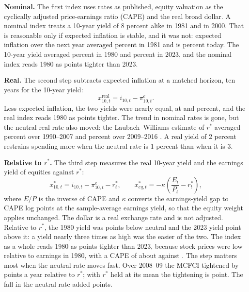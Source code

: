 \documentclass[11pt]{article}
\newcommand{\rs}{r^{*}}
\begin{document}
\textbf{Nominal.} The first index uses rates as published, equity valuation as the cyclically adjusted price-earnings ratio (CAPE) and the real broad dollar. A nominal index treats a 10-year yield of 8 percent alike in 1981 and in 2000. That is reasonable only if expected inflation is stable, and it was not: expected inflation over the next year averaged  percent in 1981 and is  percent today. The 10-year yield averaged  percent in 1980 and  percent in 2023, and the nominal index reads 1980 as  points tighter than 2023.

\textbf{Real.} The second step subtracts expected inflation at a matched horizon, ten years for the 10-year yield:
\begin{equation}\label{eq:real}
x^{\text{real}}_{10,t}=i_{10,t}-\pi^e_{10,t} .
\end{equation}
Less expected inflation, the two yields were nearly equal, at  and  percent, and the real index reads 1980 as  points tighter. The trend in nominal rates is gone, but the neutral real rate also moved: the Laubach--Williams estimate of $\rs$ averaged  percent over 1990--2007 and  percent over 2009--2016 \citep{laubach2003,holston2023}. A real yield of 2 percent restrains spending more when the neutral rate is 1 percent than when it is 3.

\textbf{Relative to $\rs$.} The third step measures the real 10-year yield and the earnings yield of equities against $\rs$:
\begin{equation}\label{eq:rstar}
x^{*}_{10,t}=i_{10,t}-\pi^e_{10,t}-\rs_t ,\qquad x^{*}_{eq,t}=-\kappa\left(\frac{E_t}{P_t}-\rs_t\right),
\end{equation}
where $E/P$ is the inverse of CAPE and $\kappa$ converts the earnings-yield gap to CAPE log points at the sample-average earnings yield, so that the equity weight applies unchanged. The dollar is a real exchange rate and is not adjusted. Relative to $\rs$, the 1980 yield was  points below neutral and the 2023 yield  point above it: a yield nearly three times as high was the easier of the two. The index as a whole reads 1980 as  points tighter than 2023, because stock prices were low relative to earnings in 1980, with a CAPE of about  against . The step matters most when the neutral rate moves fast. Over 2008--09 the MCFCI tightened by  points a year relative to $\rs$; with $\rs$ held at its mean the tightening is  point. The fall in the neutral rate added  points.
\end{document}
